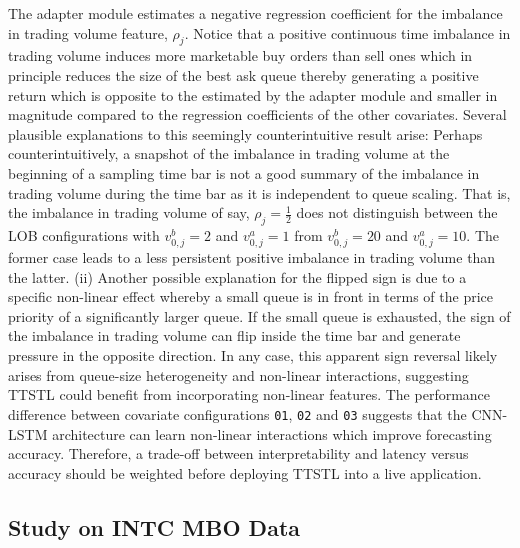 \documentclass[10pt,a4paper,oneside]{article}
\begin{document}
The adapter module estimates a negative regression coefficient for the imbalance in trading volume feature, $\rho_j$. Notice that a positive continuous time imbalance in trading volume induces more marketable buy orders than sell ones which in principle reduces the size of the best ask queue thereby generating a positive return which is opposite to the estimated by the adapter module and smaller in magnitude compared to the regression coefficients of the other covariates. Several plausible explanations to this seemingly counterintuitive result arise: Perhaps counterintuitively, a snapshot of the imbalance in trading volume at the beginning of a sampling time bar is not a good summary of the imbalance in trading volume during the time bar as it is independent to queue scaling. That is, the imbalance in trading volume of say, $\rho_j = \frac{1}{2}$ does not distinguish between the LOB configurations with $v^b_{0,j} = 2$ and $v^a_{0, j} = 1$ from $v^b_{0,j} = 20$ and $v^a_{0, j} = 10$. The former case leads to a less persistent positive imbalance in trading volume than the latter. (ii) Another possible explanation for the flipped sign is due to a specific non-linear effect whereby a small queue is in front in terms of the price priority of a significantly larger queue. If the small queue is exhausted, the sign of the imbalance in trading volume can flip inside the time bar and generate pressure in the opposite direction. In any case, this apparent sign reversal likely arises from queue-size heterogeneity and non-linear interactions, suggesting TTSTL could benefit from incorporating non-linear features. The performance difference between covariate configurations  \verb|01|, \verb|02| and \verb|03| suggests that the CNN-LSTM architecture can learn non-linear interactions which improve forecasting accuracy. Therefore, a trade-off between interpretability and latency versus accuracy should be weighted before deploying TTSTL into a live application.

\subsection{Study on INTC MBO Data}
\label{subsec:results_intc}
\end{document}
